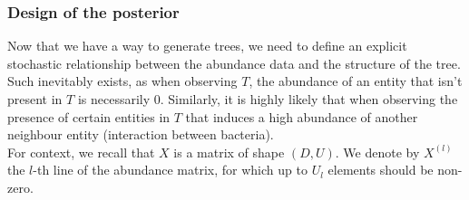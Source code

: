 \subsubsection{Design of the posterior}

Now that we have a way to generate trees, we need to define an explicit stochastic relationship between the abundance
data and the structure of the tree.
Such inevitably exists, as when observing $T$, the abundance of an entity that isn't present in $T$ is necessarily 0.
Similarly, it is highly likely that when observing the presence of certain entities in $T$ that induces a high abundance of
another neighbour entity (interaction between bacteria). \\

For context, we recall that $X$ is a matrix of shape $(D, U)$.
We denote by $X^{(l)}$ the $l$-th line of the abundance matrix, for which up to $U_l$ elements should be non-zero. \\

